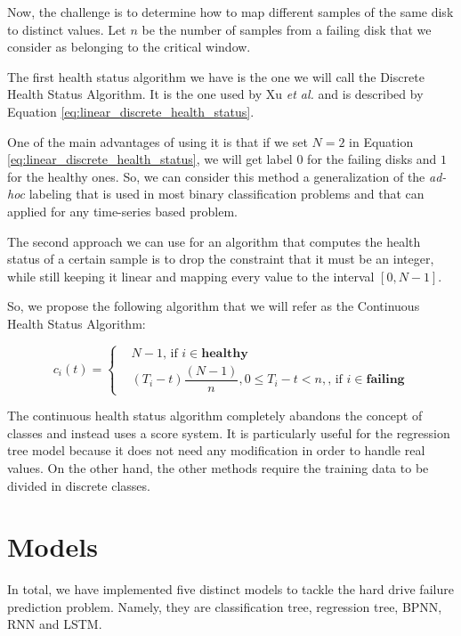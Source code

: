 Now, the challenge is to determine how to map different samples of the same disk to distinct values.
Let $n$ be the number of samples from a failing disk that we consider as belonging to the critical window.

The first health status algorithm we have is the one we will call the Discrete Health Status Algorithm.
It is the one used by Xu \textit{et al.} \cite{Xu16} and is described by Equation \ref{eq:linear_discrete_health_status}.

One of the main advantages of using it is that if we set $N = 2$ in Equation \ref{eq:linear_discrete_health_status}, we will get label $0$ for the failing disks and $1$ for the healthy ones.
So, we can consider this method a generalization of the \textit{ad-hoc} labeling that is used in most binary classification problems and that can applied for any time-series based problem.

The second approach we can use for an algorithm that computes the health status of a certain sample is to drop the constraint that it must be an integer, while still keeping it linear and mapping every value to the interval $[0,N-1]$.

So, we propose the following algorithm that we will refer as the Continuous Health Status Algorithm:

\begin{equation}\label{eq:continuous_health_status}
  c_i(t) = 
  \begin{cases}
    & N - 1 \text{, if } i \in \mathbf{healthy} \\
    & (T_i-t)\dfrac{(N-1)}{n}, 0 \leq T_i - t < n, \text{, if } i \in \mathbf{failing}
  \end{cases}
\end{equation}

The continuous health status algorithm completely abandons the concept of classes and instead uses a score system.
It is particularly useful for the regression tree model because it does not need any modification in order to handle real values.
On the other hand, the other methods require the training data to be divided in discrete classes.

\section{Models}\label{sec:models}

In total, we have implemented five distinct models to tackle the hard drive failure prediction problem.
Namely, they are classification tree, regression tree, BPNN, RNN and LSTM.

